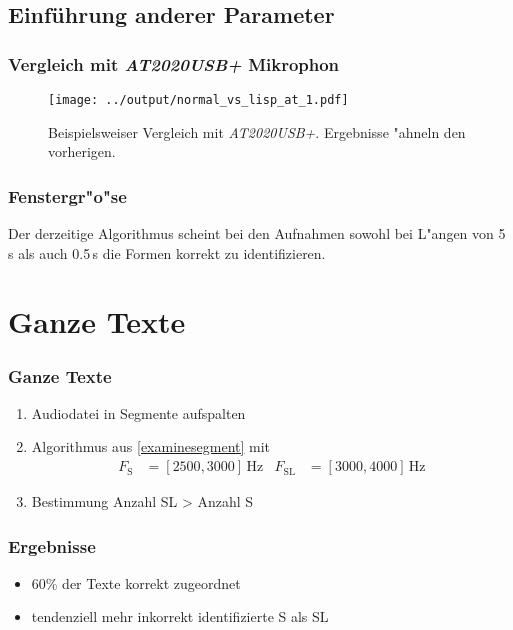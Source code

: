 \documentclass[11pt]{beamer}
\begin{document}
\subsection{Einf\"uhrung anderer Parameter}

\begin{frame}
\frametitle{Vergleich mit \textit{AT2020USB+} Mikrophon}
\begin{figure}
\texttt{[image: ../output/normal\_vs\_lisp\_at\_1.pdf]}
\caption{Beispielsweiser Vergleich mit \textit{AT2020USB+}. Ergebnisse "ahneln den vorherigen.}
\end{figure}
\end{frame}

\begin{frame}
\frametitle{Fenstergr"o"se}
Der derzeitige Algorithmus scheint bei den Aufnahmen sowohl bei L"angen von 5\,s als auch 0.5\,s die Formen korrekt zu identifizieren.
\end{frame}

\section{Ganze Texte}

\begin{frame}
\frametitle{Ganze Texte}
\begin{enumerate}
\item Audiodatei in Segmente aufspalten
\item Algorithmus aus \ref{examinesegment} mit
\begin{align*}
F_\mathrm{S} &= [2500, 3000]\,\mathrm{Hz} & F_\mathrm{SL} &= [3000, 4000]\,\mathrm{Hz}
\end{align*}
\item Bestimmung Anzahl SL > Anzahl S
\end{enumerate}
\end{frame}

\begin{frame}
\frametitle{Ergebnisse}
\begin{itemize}
\item 60\% der Texte korrekt zugeordnet
\item tendenziell mehr inkorrekt identifizierte S als SL
\end{itemize}
\end{frame}
\end{document}
